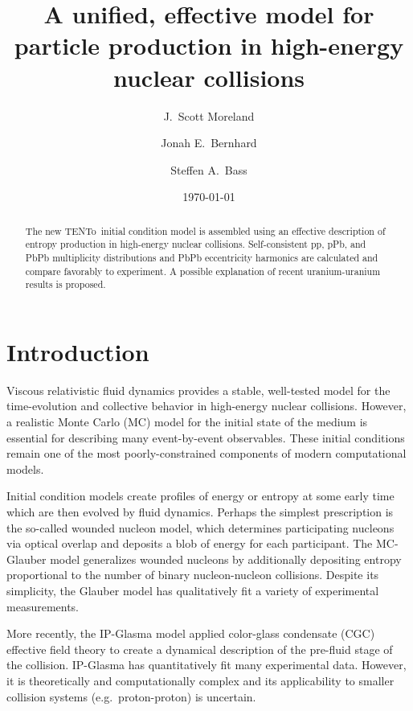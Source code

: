 \documentclass[aps,prl,reprint,amsmath,nofootinbib]{revtex4-1}
\newcommand{\trento}{T\raisebox{-.5ex}{R}ENTo}
\begin{document}
\title{A unified, effective model for particle production in high-energy nuclear collisions}

\author{J.\ Scott Moreland}
\author{Jonah E.\ Bernhard}
\author{Steffen A.\ Bass}

\date{\today}


\begin{abstract}
  The new \trento\ initial condition model is assembled using an effective description of entropy production
  in high-energy nuclear collisions.  Self-consistent pp, pPb, and PbPb multiplicity distributions and PbPb
  eccentricity harmonics are calculated and compare favorably to experiment.  A possible explanation of recent
  uranium-uranium results is proposed.
\end{abstract}


\maketitle

\section{Introduction}

Viscous relativistic fluid dynamics provides a stable, well-tested model for the time-evolution and collective
behavior in high-energy nuclear collisions.  However, a realistic Monte Carlo (MC) model for the initial state
of the medium is essential for describing many event-by-event observables.  These initial conditions remain
one of the most poorly-constrained components of modern computational models.

Initial condition models create profiles of energy or entropy at some early time which are then evolved by
fluid dynamics.  Perhaps the simplest prescription is the so-called wounded nucleon model, which determines
participating nucleons via optical overlap and deposits a blob of energy for each participant.  The MC-Glauber
model generalizes wounded nucleons by additionally depositing entropy proportional to the number of binary
nucleon-nucleon collisions.  Despite its simplicity, the Glauber model has qualitatively fit a variety of
experimental measurements.

More recently, the IP-Glasma model applied color-glass condensate (CGC) effective field theory to create a
dynamical description of the pre-fluid stage of the collision.  IP-Glasma has quantitatively fit many
experimental data.  However, it is theoretically and computationally complex and its applicability to smaller
collision systems (e.g.~proton-proton) is uncertain.
\end{document}

